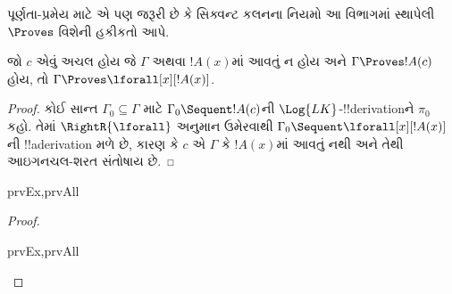 \documentclass[../../../include/open-logic-section]{subfiles}
\begin{document}

\begin{explain}
  પૂર્ણતા-પ્રમેય માટે એ પણ જરૂરી છે કે સિક્વન્ટ કલનના નિયમો આ વિભાગમાં
  સ્થાપેલી $\Proves$ વિશેની હકીકતો આપે.
\end{explain}

\begin{thm}
 જો $c$ એવું અચલ હોય જે $\Gamma$ અથવા
$!A(x)$માં આવતું ન હોય અને $\Gamma \Proves !A(c)$ હોય, તો
$\Gamma \Proves \lforall[x][!A(x)]$.
\end{thm}

\begin{proof}
કોઈ સાન્ત $\Gamma_0 \subseteq \Gamma$ માટે $\Gamma_0 \Sequent !A(c)$ની
$\Log{LK}$-!!{derivation}ને $\pi_0$ કહો. તેમાં $\RightR{\lforall}$
અનુમાન ઉમેરવાથી $\Gamma_0 \Sequent \lforall[x][!A(x)]$ની
!!a{derivation} મળે છે, કારણ કે $c$ એ $\Gamma$ કે $!A(x)$માં આવતું નથી
અને તેથી આઇગનચલ-શરત સંતોષાય છે.
\end{proof}

\begin{prop}
\begin{tagenumerate}{prvEx,prvAll}
\end{tagenumerate}
\end{prop}

\begin{proof}
\begin{tagenumerate}{prvEx,prvAll}
\end{tagenumerate}
\end{proof}
\end{document}
